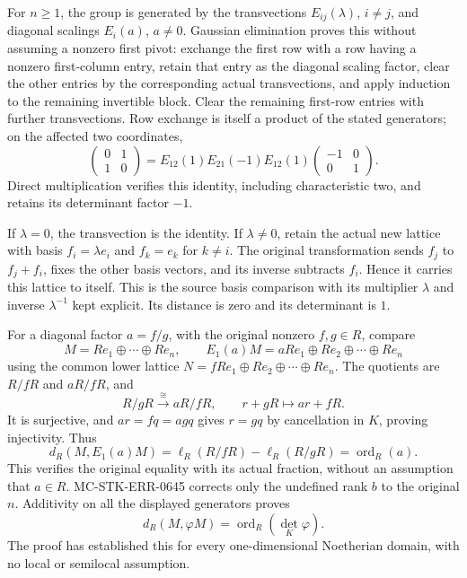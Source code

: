 For \(n\ge1\), the group is generated by the transvections \(E_{ij}(\lambda)\), \(i\ne j\), and diagonal scalings \(E_i(a)\), \(a\ne0\). Gaussian elimination proves this without assuming a nonzero first pivot: exchange the first row with a row having a nonzero first-column entry, retain that entry as the diagonal scaling factor, clear the other entries by the corresponding actual transvections, and apply induction to the remaining invertible block. Clear the remaining first-row entries with further transvections. Row exchange is itself a product of the stated generators; on the affected two coordinates, \[
 \begin{pmatrix}0&1\\1&0\end{pmatrix}
 =E_{12}(1)E_{21}(-1)E_{12}(1)
       \begin{pmatrix}-1&0\\0&1\end{pmatrix}.
\] Direct multiplication verifies this identity, including characteristic two, and retains its determinant factor \(-1\).

If \(\lambda=0\), the transvection is the identity. If \(\lambda\ne0\), retain the actual new lattice with basis \(f_i=\lambda e_i\) and \(f_k=e_k\) for \(k\ne i\). The original transformation sends \(f_j\) to \(f_j+f_i\), fixes the other basis vectors, and its inverse subtracts \(f_i\). Hence it carries this lattice to itself. This is the source basis comparison with its multiplier \(\lambda\) and inverse \(\lambda^{-1}\) kept explicit. Its distance is zero and its determinant is \(1\).

For a diagonal factor \(a=f/g\), with the original nonzero \(f,g\in R\), compare \[
 M=Re_1\oplus\cdots\oplus Re_n,\qquad
 E_1(a)M=aRe_1\oplus Re_2\oplus\cdots\oplus Re_n
\] using the common lower lattice \(N=fRe_1\oplus Re_2\oplus\cdots\oplus Re_n\). The quotients are \(R/fR\) and \(aR/fR\), and \[
 R/gR\xrightarrow{\cong}aR/fR,\qquad r+gR\longmapsto ar+fR.
\] It is surjective, and \(ar=fq=agq\) gives \(r=gq\) by cancellation in \(K\), proving injectivity. Thus \[
 d_R(M,E_1(a)M)=\ell_R(R/fR)-\ell_R(R/gR)
              =\operatorname{ord}_R(a).
\] This verifies the original equality with its actual fraction, without an assumption that \(a\in R\). MC-STK-ERR-0645 corrects only the undefined rank \(b\) to the original \(n\). Additivity on all the displayed generators proves \[
 d_R(M,\varphi M)=\operatorname{ord}_R(\det_K\varphi).
\] The proof has established this for every one-dimensional Noetherian domain, with no local or semilocal assumption.

